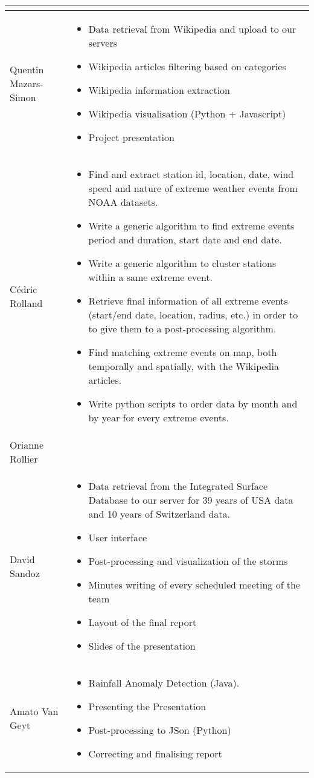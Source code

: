 \begin{longtable}{|l|p{10.5cm}|}
\begin{itemize}
\end{itemize}\\
\hline
Quentin Mazars-Simon & \begin{itemize}
	\item Data retrieval from Wikipedia and upload to our servers
	\item Wikipedia articles filtering based on categories
	\item Wikipedia information extraction
	\item Wikipedia visualisation (Python + Javascript)
	\item Project presentation
\end{itemize}\\
\hline
Cédric Rolland &  \begin{itemize}
	\item Find and extract station id, location, date, wind speed and nature of extreme weather events from NOAA datasets.
	\item Write a generic algorithm to find extreme events period and duration, start date and end date.
	\item Write a generic algorithm to cluster stations within a same extreme event.
	\item Retrieve final information of all extreme events (start/end date, location, radius, etc.) in order to to give them to a post-processing algorithm.
	\item Find matching extreme events on map, both temporally and spatially, with the Wikipedia articles.
	\item Write python scripts to order data by month and by year for every extreme events.
\end{itemize}\\
\hline
Orianne Rollier & \\
\hline
David Sandoz &
\begin{itemize}
	\item Data retrieval from the Integrated Surface Database to our server for 39 years of USA data and 10 years of Switzerland data.
	\item User interface
	\item Post-processing and visualization of the storms
	\item Minutes writing of every scheduled meeting of the team
	\item Layout of the final report
	\item Slides of the presentation
\end{itemize}\\
\hline
Amato Van Geyt & \begin{itemize}
	\item Rainfall Anomaly Detection (Java).
	\item Presenting the Presentation
	\item Post-processing to JSon (Python)
	\item Correcting and finalising report
\end{itemize}\\ 
\hline
\end{longtable}
